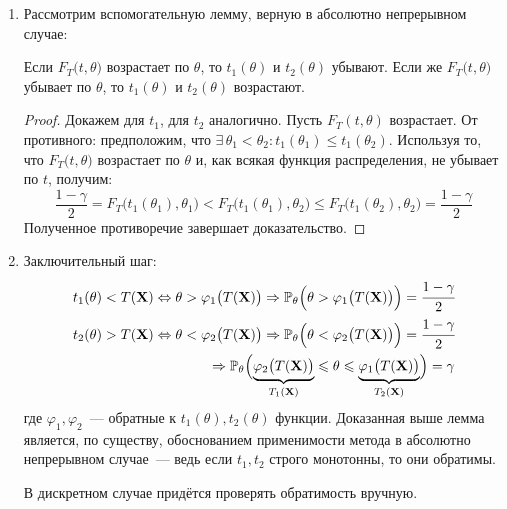 \begin{enumerate}
    \item Рассмотрим вспомогательную лемму, верную в абсолютно непрерывном случае:
        \begin{lem}
            Если $F_{T}\bigl(t, \theta\bigr)$ возрастает по $\theta$, то $t_{1}(\theta)$ и $t_{2}(\theta)$ убывают. 
            Если же $F_{T}\bigl(t, \theta\bigr)$ убывает по $\theta$, то $t_{1}(\theta)$ и $t_{2}(\theta)$ возрастают.
        \end{lem}
        \begin{proof}
            Докажем для $t_1$, для $t_2$ аналогично.
            Пусть $F_{T}(t, \theta)$ возрастает.
            От противного: предположим, что $\exists \, \theta_{1}<\theta_{2} \colon t_{1}\left(\theta_{1}\right) \leqslant t_{1}\left(\theta_{2}\right)$.
            Используя то, что $F_{T}\bigl(t, \theta\bigr)$ возрастает по $\theta$ и, как всякая функция распределения, не убывает по $t$, получим:
            \begin{equation*}
                \frac{1-\gamma}{2} = 
                F_{T}\bigl(t_{1}(\theta_{1}), \theta_{1}\bigr) < 
                F_{T}\bigl(t_{1}(\theta_{1}), \theta_{2}\bigr) \leqslant 
                F_{T}\bigl(t_{1}(\theta_{2}), \theta_{2}\bigr) = 
                \frac{1-\gamma}{2}
            \end{equation*}
            Полученное противоречие завершает доказательство.
        \end{proof}
    \item %
        Заключительный шаг:
        \begin{equation*}
            \begin{aligned}
                t_{1}(\theta) < T(\mathbf{X})
                \Leftrightarrow \theta > \varphi_{1} \bigl(T(\mathbf{X})\bigr)
                \Rightarrow 
                \mathbb{P}_{\theta}\Bigl(\theta>\varphi_{1} \bigl(T(\mathbf{X})\bigr)\Bigr)
                = \cfrac{1-\gamma}{2} \\
                t_{2}(\theta) > T(\mathbf{X}) 
                \Leftrightarrow \theta < \varphi_{2} \bigl(T(\mathbf{X})\bigr) 
                \Rightarrow 
                \mathbb{P}_{\theta}\Bigl(\theta < \varphi_{2}\bigl(T(\mathbf{X})\bigr)\Bigr)
                = \cfrac{1-\gamma}{2} \\
                \Rightarrow 
                \mathbb{P}_{\theta} \Bigl(\underbrace{\varphi_{2} \bigl(T(\mathbf{X})\bigr)}_{T_{1}(\mathbf{X})} 
                \leqslant \theta 
                \leqslant \underbrace{\varphi_{1}\bigl(T(\mathbf{X})\bigr)}_{T_{2}(\mathbf{X})} \Bigr)
                = \gamma
            \end{aligned}
        \end{equation*}
        где $\varphi_1, \varphi_2$~--- обратные к $t_1(\theta), t_2(\theta)$ функции. 
        Доказанная выше лемма является, по существу, обоснованием применимости метода в абсолютно непрерывном случае~--- 
        ведь если $t_1, t_2$ строго монотонны, то они обратимы.

        В дискретном случае придётся проверять обратимость вручную.
\end{enumerate}